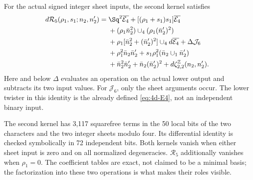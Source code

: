 For the actual signed integer sheet inputs, the second kernel satisfies
\begin{equation}\label{eq:R5identity}
 \begin{aligned}
 d\mathcal R_5(\rho_1,s_1;n_2,n'_2)={}&
 \Sq^2\overline{\mathcal E_4}
 +[(\rho_1+s_1)s_1]\overline{\mathcal E_4}\\
 &+(\rho_1\bar n_2^2)\cup_4(\rho_1(\bar n'_2)^2)\\
 &+\rho_1[\bar n_2^2+(\bar n'_2)^2]\cup_4d\overline{\mathcal E_4}
 +\Delta\mathcal J_6\\
 &+\rho_1^2\bar n_2\bar n'_2
 +s_1\rho_1^2(\bar n_2\cup_1\bar n'_2)\\
 &+\bar n_2^2\bar n'_2+\bar n_2(\bar n'_2)^2
 +d\zeta^{\mathbb Z}_{2,2}(n_2,n'_2).
 \end{aligned}
\end{equation}
Here and below $\Delta$ evaluates an operation on the actual lower output and subtracts its two input values. For $\mathcal J_6$, only the sheet arguments occur. The lower twister in this identity is the already defined \eqref{eq:4d-E4}, not an independent binary input.

The second kernel has 3,117 squarefree terms in the 50 local bits of the two characters and the two integer sheets modulo four. Its differential identity is checked symbolically in 72 independent bits. Both kernels vanish when either sheet input is zero and on all normalized degeneracies. $\mathcal R_5$ additionally vanishes when $\rho_1=0$. The coefficient tables are exact, not claimed to be a minimal basis; the factorization into these two operations is what makes their roles visible.

